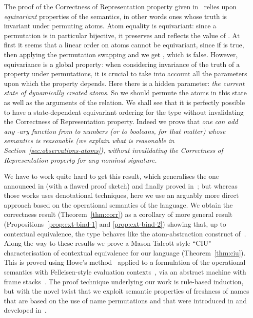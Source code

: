 \documentclass{LMCS}
\theoremstyle{plain}
\theoremstyle{definition}
\begin{document}
The proof of the Correctness of Representation property given
in~\cite{ShinwellMR:freafp,PittsAM:monsf} relies upon
\emph{equivariant} properties of the semantics, in other words ones
whose truth is invariant under permuting atoms.  Atom equality is
equivariant: since a permutation is in particular bijective, it
preserves and reflects the value of . At first it seems
that a linear order on atoms cannot be equivariant, since if
 is true, then applying the permutation
swapping  and  we get , which
is false. However, equivariance is a global property: when considering
invariance of the truth of a property under permutations, it is
crucial to take into account all the parameters upon which the
property depends. Here there is a hidden parameter: \emph{the current
  state of dynamically created atoms}. So we should permute the atoms
in this state as well as the arguments of the relation. We shall see
that it is perfectly possible to have a state-dependent equivariant
ordering for the type  without invalidating the Correctness of
Representation property.  Indeed we prove that \emph{one can add any
  -ary function from  to numbers \emph{(or to booleans, for
    that matter)} whose semantics is reasonable \emph{(we explain what
    is reasonable in Section~\ref{sec:observations-atoms})}, without
  invalidating the Correctness of Representation property for any
  nominal signature.}

We have to work quite hard to get this result, which generalises the
one announced in \cite{PittsAM:frepbm} (with a flawed proof sketch)
and finally proved in~\cite{PittsAM:monsf,ShinwellMR:freafp}; but
whereas those works uses denotational techniques, here we use an
arguably more direct approach based on the operational semantics of
the language. We obtain the correctness result
(Theorem~\ref{thm:corr}) as a corollary of more general result
(Propositions~\ref{prop:ext-bind-1} and \ref{prop:ext-bind-2}) showing
that, up to contextual equivalence, the type  behaves
like the atom-abstraction construct
of~\cite[Sect.~5]{PittsAM:newaas-jv}.  Along the way to these results
we prove a Mason-Talcott-style ``CIU''~\cite{MasonIA:equfle}
characterisation of contextual equivalence for our language
(Theorem~\ref{thm:ciu}).  This is proved using Howe's
method~\cite{HoweDJ:procbf} applied to a formulation of the
operational semantics with Felleisen-style evaluation
contexts~\cite{FelleisenM:revrst}, via an abstract machine with frame
stacks~\cite{PittsAM:opespe}. The proof technique underlying our work
is rule-based induction, but with the novel twist that we exploit
semantic properties of freshness of names that are based on the use of
name permutations and that were introduced in \cite{PittsAM:newaas-jv}
and developed
in~\cite{PittsAM:nomlfo-jv,UrbanC:fortbv,PittsAM:alpsri}.
\end{document}
